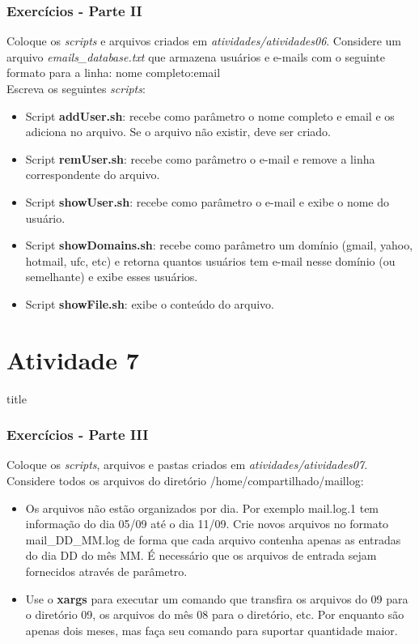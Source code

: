 \documentclass{beamer}
\begin{document}
   \begin{frame}
      \frametitle{Exercícios - Parte II}
      \scriptsize
      Coloque os \textit{scripts} e arquivos criados em \textit{atividades/atividades06}. 
      Considere um arquivo \textit{emails\_database.txt} que armazena usuários e e-mails com o seguinte formato para a linha: 
      nome completo:email \\ 
      Escreva os seguintes \textit{scripts}:
      \begin{itemize}
         \item Script \textbf{addUser.sh}: recebe como parâmetro o nome completo e email e os adiciona no arquivo. Se o arquivo não existir, deve ser criado.
	 \item Script \textbf{remUser.sh}: recebe como parâmetro o e-mail e remove a linha correspondente do arquivo.
	 \item Script \textbf{showUser.sh}: recebe como parâmetro o e-mail e exibe o nome do usuário.
	 \item Script \textbf{showDomains.sh}: recebe como parâmetro um domínio (gmail, yahoo, hotmail, ufc, etc) e retorna quantos usuários tem e-mail nesse domínio (ou semelhante) e exibe esses usuários.
	 \item Script \textbf{showFile.sh}: exibe o conteúdo do arquivo.
      \end{itemize}
   \end{frame}

\section{Atividade 7}
   \begin{frame}
      \begin{beamercolorbox}[sep=8pt,center,shadow=true,rounded=true]{title}
      \insertsectionhead\par%
      \end{beamercolorbox}
   \end{frame}
  
   \begin{frame}
      \frametitle{Exercícios - Parte III}
      Coloque os \textit{scripts}, arquivos e pastas criados em \textit{atividades/atividades07}. Considere todos os arquivos do diretório /home/compartilhado/maillog: 
      \begin{itemize}
         \item Os arquivos não estão organizados por dia. Por exemplo mail.log.1 tem informação do dia 05\slash09 até o dia 11\slash09. Crie novos arquivos no formato mail\_DD\_MM.log de forma que cada arquivo contenha apenas as entradas do dia DD do mês MM. É necessário que os arquivos de entrada sejam fornecidos através de parâmetro.
	 \item Use o \textbf{xargs} para executar um comando que transfira os arquivos do 09 para o diretório 09, os arquivos do mês 08 para o diretório, etc. Por enquanto são apenas dois meses, mas faça seu comando para suportar quantidade maior.
      \end{itemize}
   \end{frame}
\end{document}
